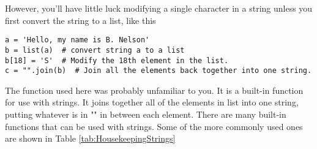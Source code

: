  However, you'll have little luck modifying a single character in a
string unless you first convert the string to a list, like this
\begin{Verbatim}
a = 'Hello, my name is B. Nelson'
b = list(a)  # convert string a to a list
b[18] = 'S'  # Modify the 18th element in the list.
c = "".join(b)  # Join all the elements back together into one string.
\end{Verbatim}
The  function used here was probably unfamiliar to you.
It is a built-in function for use with strings.  It joins together all
of the elements in list  into one string, putting whatever
is in "" in between
each element.  There are many built-in functions that can be used with
strings.  Some of the more commonly used ones are shown in Table
\ref{tab:HousekeepingStrings}

